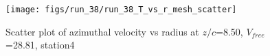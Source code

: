 \begin{figure}[H]
\centering
\texttt{[image: figs/run\_38/run\_38\_T\_vs\_r\_mesh\_scatter]}
\caption{Scatter plot of azimuthal velocity vs radius at $z/c$=8.50, $V_{free}$=28.81, station4}
\label{fig:run_38_T_vs_r_mesh_scatter}
\end{figure}



